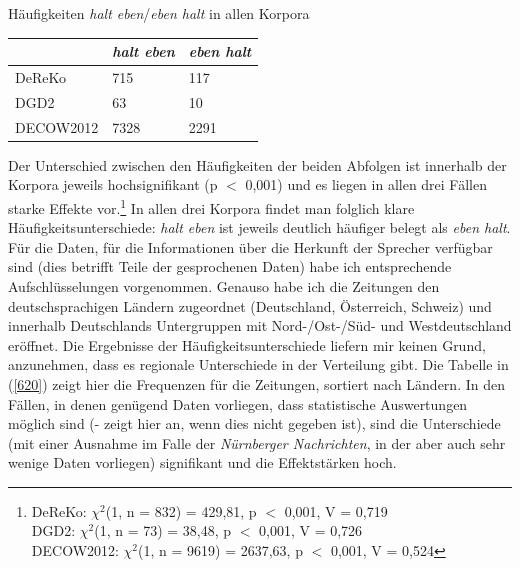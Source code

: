 \begin{exe}
	\ex\label{619} Häufigkeiten \textit{halt eben}/\textit{eben halt} in allen Korpora\\[-1em]
     \begin{tabular}[t]{|l|l|l|}
     \hline
     & \textit{halt eben} & \textit{eben halt}\\
     \hline
     DeReKo & 715 & 117\\
     \hline
     DGD2 & 63 & 10\\
     \hline
     DECOW2012 & 7328 & 2291\\
     \hline
     \end{tabular}
\end{exe}
Der Unterschied zwischen den Häufigkeiten der beiden Abfolgen ist innerhalb der Korpora jeweils hochsignifikant (p $<$ 0,001) und es liegen in allen drei Fällen starke Effekte vor.\footnote{DeReKo: $\chi^2$(1, n = 832) = 429,81, p $<$ 0,001, V = 0,719\\
DGD2: $\chi^2$(1, n = 73) = 38,48, p $<$ 0,001, V = 0,726\\
DECOW2012: $\chi^2$(1, n = 9619) = 2637,63, p $<$ 0,001, V = 0,524} In allen drei Korpora findet man folglich klare Häufigkeits\-unterschiede: \textit{halt eben} ist jeweils deutlich häufiger belegt als \textit{eben halt}. Für die Daten, für die Informationen über die Herkunft der Sprecher verfügbar sind (dies betrifft Teile der gesprochenen Daten) habe ich entsprechende Aufschlüsselungen vorgenommen. Genauso habe ich die Zeitungen den deutschsprachigen Ländern zugeordnet (Deutschland, Österreich, Schweiz) und innerhalb Deutschlands Untergruppen mit Nord-/Ost-/Süd- und Westdeutschland eröffnet. Die Ergebnisse der Häufigkeitsunterschiede liefern mir keinen Grund, anzunehmen, dass es regionale Unterschiede in der Verteilung gibt. Die Tabelle in (\ref{620}) zeigt hier die Frequenzen für die Zeitungen, sortiert nach Ländern. In den Fällen, in denen genügend Daten vorliegen, dass statistische Auswertungen möglich sind (\glqq -\grqq{} zeigt hier an, wenn dies nicht gegeben ist), sind die Unterschiede (mit einer Ausnahme im Falle der \textit{Nürnberger Nachrichten}, in der aber auch sehr wenige Daten vorliegen) signifikant und die Effektstärken hoch.
\pagebreak
